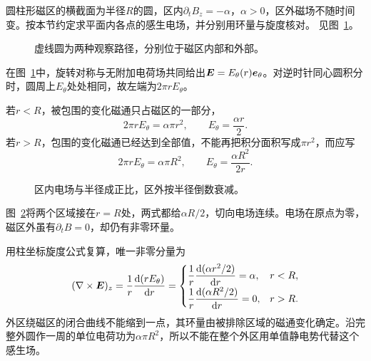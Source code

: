 \begin{example}[有限圆磁区的内外感生场]\label{ex:i1-e4}
圆柱形磁区的横截面为半径$R$的圆，区内$\partial_tB_z=-\alpha$，$\alpha>0$，区外磁场不随时间变。按本节约定求平面内各点的感生电场，并分别用环量与旋度核对。 见图~\ref{fig:i1-e4-q}。
\end{example}

\begin{figure}[H]\centering
{}
\caption{虚线圆为两种观察路径，分别位于磁区内部和外部。}\label{fig:i1-e4-q}
\end{figure}
\begin{solution}
在图~\ref{fig:i1-e4-q}中，旋转对称与无附加电荷场共同给出$\bm{E}=E_\theta(r)\bm{e}_\theta$。对逆时针同心圆积分时，圆周上$E_\theta$处处相同，故左端为$2\pi rE_\theta$。

若$r<R$，被包围的变化磁通只占磁区的一部分，
\[2\pi rE_\theta=\alpha\pi r^2,\qquad
E_\theta=\frac{\alpha r}{2}.
\]
若$r>R$，包围的变化磁通已经达到全部值，不能再把积分面积写成$\pi r^2$，而应写
\[2\pi rE_\theta=\alpha\pi R^2,\qquad
E_\theta=\frac{\alpha R^2}{2r}.
\]

\begin{figure}[H]\centering
{}
\caption{区内电场与半径成正比，区外按半径倒数衰减。}\label{fig:i1-e4-s}
\end{figure}

图~\ref{fig:i1-e4-s}将两个区域接在$r=R$处，两式都给$\alpha R/2$，切向电场连续。电场在原点为零，磁区外虽有$\partial_tB=0$，却仍有非零环量。

用柱坐标旋度公式复算，唯一非零分量为
\[(\nabla\times\bm{E})_z=\frac1r\frac{\mathop{}\!\mathrm d(rE_\theta)}{\mathop{}\!\mathrm d r}
=\begin{cases}
\displaystyle\frac1r\frac{\mathop{}\!\mathrm d(\alpha r^2/2)}{\mathop{}\!\mathrm d r}=\alpha,&r<R,\\[4pt]
\displaystyle\frac1r\frac{\mathop{}\!\mathrm d(\alpha R^2/2)}{\mathop{}\!\mathrm d r}=0,&r>R.
\end{cases}\]
外区绕磁区的闭合曲线不能缩到一点，其环量由被排除区域的磁通变化确定。沿完整外圆作一周的单位电荷功为$\alpha\pi R^2$，所以不能在整个外区用单值静电势代替这个感生场。
\end{solution}

